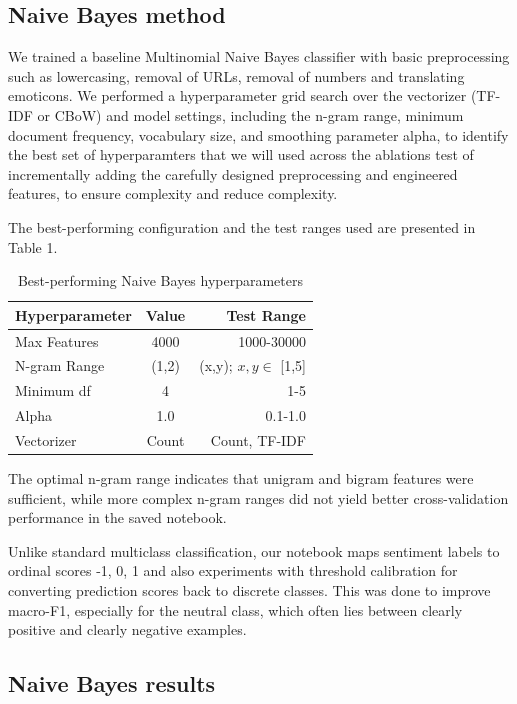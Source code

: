 \documentclass[11pt]{article}
\begin{document}
\subsection{Naive Bayes method}
We trained a baseline Multinomial Naive Bayes classifier with basic preprocessing such as lowercasing, removal of URLs, removal of numbers and translating emoticons. We performed a hyperparameter grid search over the vectorizer (TF-IDF or CBoW) and model settings, including the n-gram range, minimum document frequency, vocabulary size, and smoothing parameter alpha, to identify the best
set of hyperparamters that we will used across the ablations test of incrementally adding the carefully designed preprocessing and engineered features, to ensure complexity and reduce complexity.

The best-performing configuration and the test ranges used are presented in Table 1.

\begin{table}[!ht]
\centering
\begin{tabular}{lcr}
\hline
\textbf{Hyperparameter} & \textbf{Value} & \textbf{Test Range} \\
\hline
Max Features & 4000 & 1000-30000 \\
N-gram Range & (1,2) & (x,y); $x,y \in $ [1,5] \\
Minimum df & 4 & 1-5 \\
Alpha & 1.0 & 0.1-1.0\\
Vectorizer & Count & Count, TF-IDF \\
\hline
\end{tabular}
\caption{Best-performing Naive Bayes hyperparameters}
\end{table}

The optimal n-gram range indicates that unigram and bigram features were sufficient, while more complex n-gram ranges did not yield better cross-validation performance in the saved notebook.

Unlike standard multiclass classification, our notebook maps sentiment labels to ordinal scores {-1, 0, 1} and also experiments with threshold calibration for converting prediction scores back to discrete classes. This was done to improve macro-F1, especially for the neutral class, which often lies between clearly positive and clearly negative examples.

\subsection{Naive Bayes results}
\end{document}
